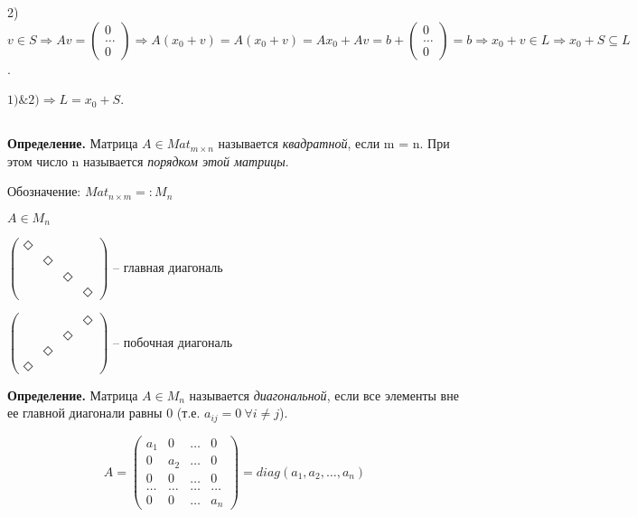 2) $v \in S \Rightarrow Av = \begin{pmatrix} 0 \\ \dots \\ 0  \end{pmatrix} \Rightarrow A(x_0 + v) = A(x_0 + v) = Ax_0 + Av = b + \begin{pmatrix} 0 \\ \dots \\ 0  \end{pmatrix} = b \Rightarrow x_0 + v \in L \Rightarrow x_0 + S \subseteq L$.

$1) \& 2) \Rightarrow L = x_0 + S$.

\subsection{}
\bigskip
\textbf{Определение.} Матрица $A \in Mat_{m \times n}$ называется \textit{квадратной}, если m = n. При этом число n называется \textit{порядком этой матрицы}.

Обозначение: $Mat_{n \times m} =: M_n$

\bigskip
$A \in M_n$ 

$ \begin{pmatrix} \Diamond & & & \\ & \Diamond & & \\ & & \Diamond & \\ & & & \Diamond \end{pmatrix} $ -- главная диагональ


$ \begin{pmatrix} & & & \Diamond \\ & & \Diamond & \\ & \Diamond & & \\ \Diamond & & & \end{pmatrix} $ -- побочная диагональ

\bigskip
\textbf{Определение.} Матрица $A \in M_n$ называется \textit{диагональной}, если все элементы вне ее главной диагонали равны 0 (т.е. $a_{ij} = 0 \ \forall i \neq j$). 

\begin{equation*}A =  \begin{pmatrix} a_1 & 0 & \dots & 0 \\ 0 & a_2 & \dots & 0  \\ 0 & 0 & \dots & 0 \\ \dots & \dots & \dots & \dots \\ 0 & 0 & \dots & a_n \end{pmatrix} = diag(a_1, a_2, \dots , a_n) \end{equation*}


